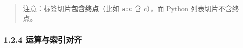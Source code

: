 \begin{Shaded}
\begin{Highlighting}[]
\NormalTok{(s3[}\NormalTok{:}\NormalTok{])   }
\OperatorTok{=}\NormalTok{ pd.Series([}\NormalTok{, }\NormalTok{, }\NormalTok{, }\NormalTok{, }\NormalTok{], index}\OperatorTok{=}\NormalTok{[}\NormalTok{, }\NormalTok{, }\NormalTok{, }\NormalTok{, }\NormalTok{])}
\NormalTok{(s5[}\NormalTok{:}\NormalTok{])       }
\end{Highlighting}
\end{Shaded}

\begin{Shaded}
\begin{Highlighting}[]
\end{Highlighting}
\end{Shaded}

\begin{quote}
注意：标签切片\textbf{包含终点}（比如
\texttt{\textquotesingle{}a\textquotesingle{}:\textquotesingle{}c\textquotesingle{}}
含 c），而 Python 列表切片不含终点。
\end{quote}

\subsubsection{1.2.4
运算与索引对齐}\label{ux8fd0ux7b97ux4e0eux7d22ux5f15ux5bf9ux9f50}

\begin{Shaded}
\begin{Highlighting}[]
\OperatorTok{=}\OperatorTok{+} 
\NormalTok{(}\NormalTok{)}

\OperatorTok{=}\NormalTok{ pd.Series([}\NormalTok{, }\NormalTok{, }\NormalTok{], index}\OperatorTok{=}\NormalTok{[}\NormalTok{, }\NormalTok{, }\NormalTok{])}
\NormalTok{(}\NormalTok{)}
\OperatorTok{+}
\end{Highlighting}
\end{Shaded}


